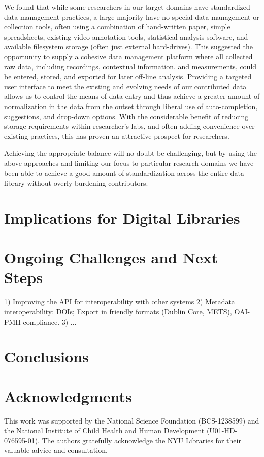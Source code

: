 \documentclass{sig-alternate}
\begin{document}
We found that while some researchers in our target domains have standardized data management practices, a large majority have no special data management or collection tools, often using a combination of hand-written paper, simple spreadsheets, existing video annotation tools, statistical analysis software, and available filesystem storage (often just external hard-drives).
This suggested the opportunity to supply a cohesive data management platform where all collected raw data, including recordings, contextual information, and measurements, could be entered, stored, and exported for later off-line analysis.
Providing a targeted user interface to meet the existing and evolving needs of our contributed data allows us to control the means of data entry and thus achieve a greater amount of normalization in the data from the outset through liberal use of auto-completion, suggestions, and drop-down options.
With the considerable benefit of reducing storage requirements within researcher's labs, and often adding convenience over existing practices, this has proven an attractive prospect for researchers.

Achieving the appropriate balance will no doubt be challenging, but by using the above approaches and limiting our focus to particular research domains we have been able to achieve a good amount of standardization across the entire data library without overly burdening contributors.

\section{Implications for Digital Libraries}


\section{Ongoing Challenges and Next Steps}
  
 1) Improving the API for interoperability with other systems
 2) Metadata interoperability: DOIs; Export in friendly formats (Dublin Core, METS), OAI-PMH compliance.
 3) ...

\section{Conclusions}

\section*{Acknowledgments}

This work was supported by the National Science Foundation (BCS-1238599) and the National Institute of Child Health and Human Development (U01-HD-076595-01).
The authors gratefully acknowledge the NYU Libraries for their valuable advice and consultation.



\end{document}

